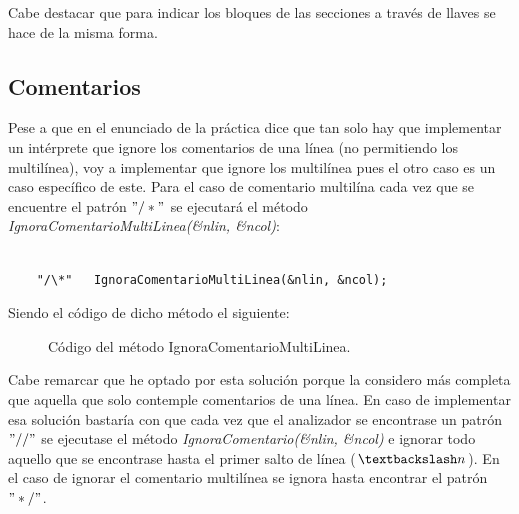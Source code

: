 \documentclass[11pt]{article}
\begin{document}
\noindent Cabe destacar que para indicar los bloques de las secciones a través de llaves se hace de la misma forma.


\subsection{Comentarios}

\noindent Pese a que en el enunciado de la práctica dice que tan solo hay que implementar un intérprete que ignore los comentarios de una línea (no permitiendo los multilínea), voy a implementar que ignore los multilínea pues el otro caso es un caso específico de este. Para el caso de comentario multilína cada vez que se encuentre el patrón \textit{$"/*"$} se ejecutará el método \textit{IgnoraComentarioMultiLinea(&nlin, &ncol)}:

\begin{verbatim}

    "/\*"   IgnoraComentarioMultiLinea(&nlin, &ncol);

\end{verbatim}

\noindent Siendo el código de dicho método el siguiente: \\

\begin{figure}[H]
  \centering
  \caption{Código del método IgnoraComentarioMultiLinea.}
\end{figure}

\noindent Cabe remarcar que he optado por esta solución porque la considero más completa que aquella que solo contemple comentarios de una línea. En caso de implementar esa solución bastaría con que cada vez que el analizador se encontrase un patrón $"//"$ se ejecutase el método \textit{IgnoraComentario(&nlin, &ncol)} e ignorar todo aquello que se encontrase hasta el primer salto de línea (\textit{$\textbackslash n$}). En el caso de ignorar el comentario multilínea se ignora hasta encontrar el patrón $"*/"$.
\end{document}
